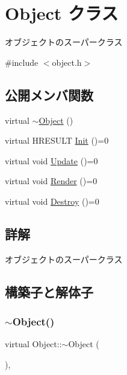 \hypertarget{class_object}{}\section{Object クラス}
\label{class_object}


オブジェクトのスーパークラス  




{\ttfamily \#include $<$object.\+h$>$}

\subsection*{公開メンバ関数}
\begin{DoxyCompactItemize}
\item 
virtual \mbox{\hyperlink{class_object_aa3e791419d84c4c346ef9499513b8e00}{$\sim$\+Object}} ()
\item 
virtual H\+R\+E\+S\+U\+LT \mbox{\hyperlink{class_object_a6e2cc01de0a4cf70bb779c059860eced}{Init}} ()=0
\item 
virtual void \mbox{\hyperlink{class_object_a5ee5c17a09981cbd7c469370e210b4ff}{Update}} ()=0
\item 
virtual void \mbox{\hyperlink{class_object_a19d531b9d8086ece15c228899ce456bf}{Render}} ()=0
\item 
virtual void \mbox{\hyperlink{class_object_acd8a6b7eebef988f20f6bf8c53d9b4bc}{Destroy}} ()=0
\end{DoxyCompactItemize}


\subsection{詳解}
オブジェクトのスーパークラス 

\subsection{構築子と解体子}
\mbox{\label{class_object_aa3e791419d84c4c346ef9499513b8e00}} 
\subsubsection{\texorpdfstring{$\sim$\+Object()}{~Object()}}
{\footnotesize\ttfamily virtual Object\+::$\sim$\+Object (\begin{DoxyParamCaption}{ }\end{DoxyParamCaption})\hspace{0.3cm}{\ttfamily [inline]}, {\ttfamily [virtual]}}



